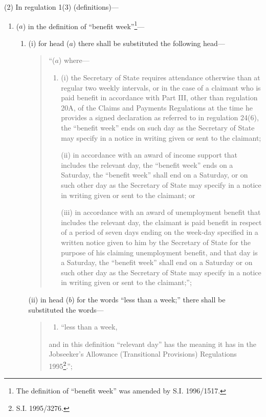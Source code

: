 \documentclass[a4paper]{article}
\begin{document}
(2) In regulation 1(3) (definitions)—
\begin{enumerate}\item[]
($a$) in the definition of “benefit week”\footnote{\frenchspacing The definition of “benefit week” was amended by S.I. 1996/1517.}—
\begin{enumerate}\item[]
(i) for head ($a$) there shall be substituted the following head—
\begin{quotation}
“($a$) where—
\begin{enumerate}\item[]
(i) the Secretary of State requires attendance otherwise than at regular two weekly intervals, or in the case of a claimant who is paid benefit in accordance with Part III, other than regulation 20A, of the Claims and Payments Regulations at the time he provides a signed declaration as referred to in regulation 24(6), the “benefit week” ends on such day as the Secretary of State may specify in a notice in writing given or sent to the claimant;

(ii) in accordance with an award of income support that includes the relevant day, the “benefit week” ends on a Saturday, the “benefit week” shall end on a Saturday, or on such other day as the Secretary of State may specify in a notice in writing given or sent to the claimant; or

(iii) in accordance with an award of unemployment benefit that includes the relevant day, the claimant is paid benefit in respect of a period of seven days ending on the week-day specified in a written notice given to him by the Secretary of State for the purpose of his claiming unemployment benefit, and that day is a Saturday, the “benefit week” shall end on a Saturday or on such other day as the Secretary of State may specify in a notice in writing given or sent to the claimant;”;
\end{enumerate}
\end{quotation}

(ii) in head ($b$) for the words “less than a week;” there shall be substituted the words—
\begin{quotation}
\begin{enumerate}\item[]
“less than a week,
\end{enumerate}\noindent
and in this definition “relevant day” has the meaning it has in the Jobseeker’s Allowance (Transitional Provisions) Regulations 1995\footnote{\frenchspacing S.I. 1995/3276.}.”;
\end{quotation}
\end{enumerate}


\end{enumerate}
\end{document}
